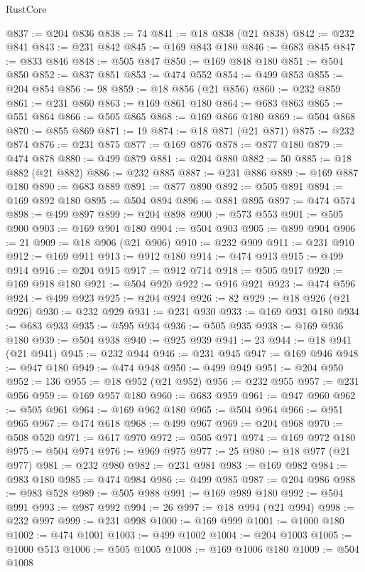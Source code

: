 \begin{lexlean}{RustCore}
\begin{coremodule}
@837 := @204 @836
@838 := 74
@841 := @18 @838 (@21 @838)
@842 := @232 @841
@843 := @231 @842
@845 := @169 @843 @180
@846 := @683 @845
@847 := @833 @846
@848 := @505 @847
@850 := @169 @848 @180
@851 := @504 @850
@852 := @837 @851
@853 := @474 @552
@854 := @499 @853
@855 := @204 @854
@856 := 98
@859 := @18 @856 (@21 @856)
@860 := @232 @859
@861 := @231 @860
@863 := @169 @861 @180
@864 := @683 @863
@865 := @551 @864
@866 := @505 @865
@868 := @169 @866 @180
@869 := @504 @868
@870 := @855 @869
@871 := 19
@874 := @18 @871 (@21 @871)
@875 := @232 @874
@876 := @231 @875
@877 := @169 @876
@878 := @877 @180
@879 := @474 @878
@880 := @499 @879
@881 := @204 @880
@882 := 50
@885 := @18 @882 (@21 @882)
@886 := @232 @885
@887 := @231 @886
@889 := @169 @887 @180
@890 := @683 @889
@891 := @877 @890
@892 := @505 @891
@894 := @169 @892 @180
@895 := @504 @894
@896 := @881 @895
@897 := @474 @574
@898 := @499 @897
@899 := @204 @898
@900 := @573 @553
@901 := @505 @900
@903 := @169 @901 @180
@904 := @504 @903
@905 := @899 @904
@906 := 21
@909 := @18 @906 (@21 @906)
@910 := @232 @909
@911 := @231 @910
@912 := @169 @911
@913 := @912 @180
@914 := @474 @913
@915 := @499 @914
@916 := @204 @915
@917 := @912 @714
@918 := @505 @917
@920 := @169 @918 @180
@921 := @504 @920
@922 := @916 @921
@923 := @474 @596
@924 := @499 @923
@925 := @204 @924
@926 := 82
@929 := @18 @926 (@21 @926)
@930 := @232 @929
@931 := @231 @930
@933 := @169 @931 @180
@934 := @683 @933
@935 := @595 @934
@936 := @505 @935
@938 := @169 @936 @180
@939 := @504 @938
@940 := @925 @939
@941 := 23
@944 := @18 @941 (@21 @941)
@945 := @232 @944
@946 := @231 @945
@947 := @169 @946
@948 := @947 @180
@949 := @474 @948
@950 := @499 @949
@951 := @204 @950
@952 := 136
@955 := @18 @952 (@21 @952)
@956 := @232 @955
@957 := @231 @956
@959 := @169 @957 @180
@960 := @683 @959
@961 := @947 @960
@962 := @505 @961
@964 := @169 @962 @180
@965 := @504 @964
@966 := @951 @965
@967 := @474 @618
@968 := @499 @967
@969 := @204 @968
@970 := @508 @520
@971 := @617 @970
@972 := @505 @971
@974 := @169 @972 @180
@975 := @504 @974
@976 := @969 @975
@977 := 25
@980 := @18 @977 (@21 @977)
@981 := @232 @980
@982 := @231 @981
@983 := @169 @982
@984 := @983 @180
@985 := @474 @984
@986 := @499 @985
@987 := @204 @986
@988 := @983 @528
@989 := @505 @988
@991 := @169 @989 @180
@992 := @504 @991
@993 := @987 @992
@994 := 26
@997 := @18 @994 (@21 @994)
@998 := @232 @997
@999 := @231 @998
@1000 := @169 @999
@1001 := @1000 @180
@1002 := @474 @1001
@1003 := @499 @1002
@1004 := @204 @1003
@1005 := @1000 @513
@1006 := @505 @1005
@1008 := @169 @1006 @180
@1009 := @504 @1008

\end{coremodule}
\end{lexlean}
